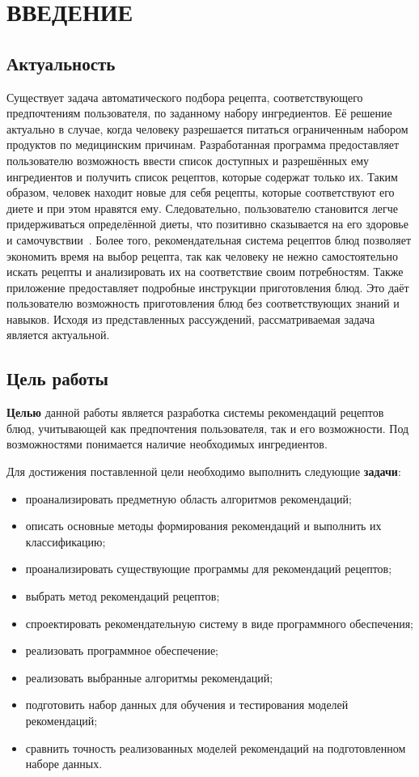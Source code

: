 \chapter*{ВВЕДЕНИЕ}

\section*{Актуальность}
Существует задача автоматического подбора рецепта, соответствующего предпочтениям пользователя, по заданному набору ингредиентов.
Её решение актуально в случае, когда человеку разрешается питаться ограниченным набором продуктов по медицинским причинам.
Разработанная программа предоставляет пользователю возможность ввести список доступных и разрешённых ему ингредиентов и получить список рецептов, которые содержат только их.
Таким образом, человек находит новые для себя рецепты, которые соответствуют его диете и при этом нравятся ему.
Следовательно, пользователю становится легче придерживаться определённой диеты, что позитивно сказывается на его здоровье и самочувствии~\cite{zholobova2022nutrition}.
Более того, рекомендательная система рецептов блюд позволяет экономить время на выбор рецепта, так как человеку не нежно самостоятельно искать рецепты и анализировать их на соответствие своим потребностям.
Также приложение предоставляет подробные инструкции приготовления блюд.
Это даёт пользователю возможность приготовления блюд без соответствующих знаний и навыков.
Исходя из представленных рассуждений, рассматриваемая задача является актуальной.

\section*{Цель работы}
\textbf{Целью} данной работы является разработка системы рекомендаций рецептов блюд, учитывающей как предпочтения пользователя, так и его возможности.
Под возможностями понимается наличие необходимых ингредиентов.

Для достижения поставленной цели необходимо выполнить следующие \textbf{задачи}:
\begin{itemize}
    \item проанализировать предметную область алгоритмов рекомендаций;
    \item описать основные методы формирования рекомендаций и выполнить их классификацию;
    \item проанализировать существующие программы для рекомендаций рецептов;
    \item выбрать метод рекомендаций рецептов;
    \item спроектировать рекомендательную систему в виде программного обеспечения;
    \item реализовать программное обеспечение;
    \item реализовать выбранные алгоритмы рекомендаций;
    \item подготовить набор данных для обучения и тестирования моделей рекомендаций;
    \item сравнить точность реализованных моделей рекомендаций на подготовленном наборе данных.
\end{itemize}
